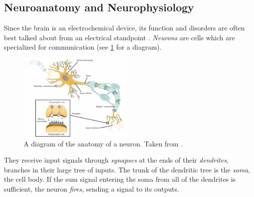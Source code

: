 \subsection{Neuroanatomy and Neurophysiology}
\label{sec:intro_seizures_neuroanatomy}
Since the brain is an electrochemical device, its function and disorders are often best talked about from an electrical standpoint \cite{Deco2008}.
\textit{Neurons} are cells which are specialized for communication (see \cref{fig:neuron_diagram} for a diagram).
\begin{figure}[ht]
  \centering
  \includegraphics[width=0.5\textwidth]{figure/neuron_diagram}
  \caption[Neuron diagram]{A diagram of the anatomy of a neuron.
    Taken from \cite{Molnar2013}.
  }
  \label{fig:neuron_diagram}
\end{figure}
They receive input signals through \textit{synapses} at the ends of their \textit{dendrites}, branches in their large tree of inputs.
The trunk of the dendritic tree is the \textit{soma}, the cell body.
If the sum signal entering the soma from all of the dendrites is sufficient, the neuron \textit{fires}, sending a signal to its outputs.

